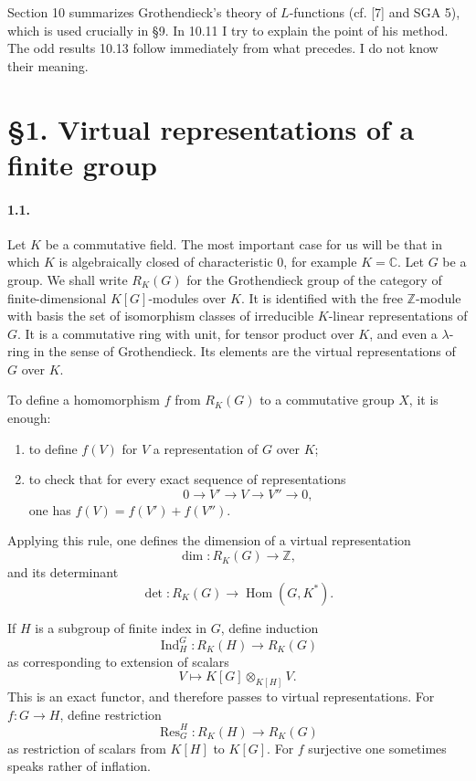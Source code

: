 \documentclass[10pt]{article}
\newcommand{\C}{\mathbb C}
\newcommand{\Z}{\mathbb Z}
\newcommand{\Hom}{\operatorname{Hom}}
\newcommand{\Ind}{\operatorname{Ind}}
\newcommand{\Res}{\operatorname{Res}}
\providecommand{\Hom}{\operatorname{Hom}}
\providecommand{\Hom}{\operatorname{Hom}}
\providecommand{\Hom}{\operatorname{Hom}}
\providecommand{\Ind}{\operatorname{Ind}}
\begin{document}
Section 10 summarizes Grothendieck's theory of \(L\)-functions (cf. [7] and SGA 5), which is used crucially in §9. In 10.11 I try to explain the point of his method. The odd results 10.13 follow immediately from what precedes. I do not know their meaning.

\section*{\S1. Virtual representations of a finite group}

\paragraph{1.1.} Let \(K\) be a commutative field. The most important case for us will be that in which \(K\) is algebraically closed of characteristic \(0\), for example \(K=\C\). Let \(G\) be a group. We shall write \(R_K(G)\) for the Grothendieck group of the category of finite-dimensional \(K[G]\)-modules over \(K\). It is identified with the free \(\Z\)-module with basis the set of isomorphism classes of irreducible \(K\)-linear representations of \(G\). It is a commutative ring with unit, for tensor product over \(K\), and even a \(\lambda\)-ring in the sense of Grothendieck. Its elements are the virtual representations of \(G\) over \(K\).

To define a homomorphism \(f\) from \(R_K(G)\) to a commutative group \(X\), it is enough:
\begin{enumerate}[label=\alph*)]
\item to define \(f(V)\) for \(V\) a representation of \(G\) over \(K\);
\item to check that for every exact sequence of representations
\[
0\longrightarrow V'\longrightarrow V\longrightarrow V''\longrightarrow0,
\]
one has \(f(V)=f(V')+f(V'')\).
\end{enumerate}
Applying this rule, one defines the dimension of a virtual representation
\[
\dim:R_K(G)\longrightarrow\Z,
\]
and its determinant
\[
\det:R_K(G)\longrightarrow\Hom(G,K^*).
\]

If \(H\) is a subgroup of finite index in \(G\), define induction
\[
\Ind_H^G:R_K(H)\longrightarrow R_K(G)
\]
as corresponding to extension of scalars
\[
V\longmapsto K[G]\otimes_{K[H]}V.
\]
This is an exact functor, and therefore passes to virtual representations. For \(f:G\to H\), define restriction
\[
\Res_G^H:R_K(H)\longrightarrow R_K(G)
\]
as restriction of scalars from \(K[H]\) to \(K[G]\). For \(f\) surjective one sometimes speaks rather of inflation.
\end{document}

